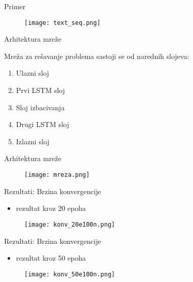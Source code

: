\documentclass[table]{beamer}
\begin{document}
\begin{frame}{Primer}
\begin{figure}
    \centering
    \texttt{[image: text\_seq.png]}
\end{figure}
\end{frame}

\begin{frame}{Arhitektura mreže}

Mreža za rešavanje problema sastoji se od narednih slojeva:
\begin{enumerate}
    \item Ulazni sloj 
    \item Prvi LSTM sloj
    \item Sloj izbacivanja 
    \item Drugi LSTM sloj
    \item Izlazni sloj
\end{enumerate}
    
\end{frame}

\begin{frame}{Arhitektura mreže}
\begin{figure}
    \centering
    \texttt{[image: mreza.png]}
\end{figure}
    
\end{frame}

\begin{frame}{Rezultati: Brzina konvergencije}
\begin{itemize}
    \item rezultat kroz 20 epoha
\end{itemize}
\begin{figure}
    \centering
    \texttt{[image: konv\_20e100n.png]}
\end{figure}
    
\end{frame}

\begin{frame}{Rezultati: Brzina konvergencije}
\begin{itemize}
    \item rezultat kroz 50 epoha
\end{itemize}
\begin{figure}
    \centering
    \texttt{[image: konv\_50e100n.png]}
\end{figure}
    
\end{frame}
\end{document}
